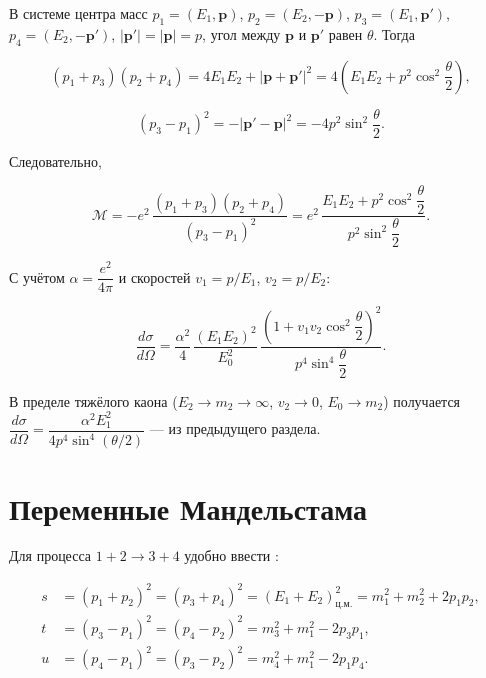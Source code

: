 \documentclass[../final.tex]{subfiles}
\begin{document}
В системе центра масс
$p_1=(E_1,\mathbf p)$, $p_2=(E_2,-\mathbf p)$,
$p_3=(E_1,\mathbf p')$, $p_4=(E_2,-\mathbf p')$,
$|\mathbf p'|=|\mathbf p|=p$, угол между $\mathbf p$
и $\mathbf p'$ равен $\theta$. Тогда

\begin{equation*}
    \left(p_1+p_3\right)\left(p_2+p_4\right)
    =
    4E_1E_2+|\mathbf p+\mathbf p'|^2
    =
    4\left(E_1E_2+p^2\cos^2\frac{\theta}{2}\right),
\end{equation*}

\begin{equation*}
    \left(p_3-p_1\right)^2
    =
    -|\mathbf p'-\mathbf p|^2
    =
    -4p^2\sin^2\frac{\theta}{2}.
\end{equation*}

Следовательно,

\begin{equation*}
    \mathcal M
    =
    -e^2\,
    \frac{\left(p_1+p_3\right)\left(p_2+p_4\right)}
         {\left(p_3-p_1\right)^2}
    =
    e^2\,
    \frac{E_1E_2+p^2\cos^2\dfrac{\theta}{2}}
         {p^2\sin^2\dfrac{\theta}{2}}.
\end{equation*}

С учётом $\alpha=\dfrac{e^2}{4\pi}$ и скоростей
$v_1=p/E_1$, $v_2=p/E_2$:

\begin{equation*}
    \frac{d\sigma}{d\Omega}
    =
    \frac{\alpha^2}{4}\,
    \frac{\left(E_1E_2\right)^2}{E_0^2}\,
    \frac{
        \left(1+v_1v_2\cos^2\dfrac{\theta}{2}\right)^2
    }{
        p^4\sin^4\dfrac{\theta}{2}
    }.
\end{equation*}

\remark
В пределе тяжёлого каона ($E_2\to m_2\to\infty$, $v_2\to0$,
$E_0\to m_2$) получается $\dfrac{d\sigma}{d\Omega}
=\dfrac{\alpha^2E_1^2}{4p^4\sin^4(\theta/2)}$ ---
 из предыдущего раздела.


\section{Переменные Мандельстама}

Для процесса $1+2\rightarrow3+4$ удобно ввести
:

\begin{align*}
    s&=\left(p_1+p_2\right)^2=\left(p_3+p_4\right)^2
      =\left(E_1+E_2\right)^2_{\text{ц.м.}}
      =m_1^2+m_2^2+2p_1p_2,\\[4pt]
    t&=\left(p_3-p_1\right)^2=\left(p_4-p_2\right)^2
      =m_3^2+m_1^2-2p_3p_1,\\[4pt]
    u&=\left(p_4-p_1\right)^2=\left(p_3-p_2\right)^2
      =m_4^2+m_1^2-2p_1p_4.
\end{align*}
\end{document}
